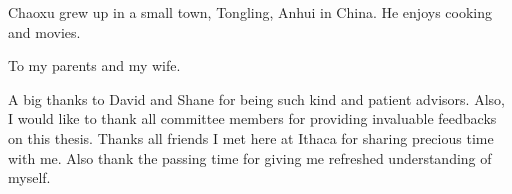 \documentclass[phd,tocprelim]{cornell}
\begin{document}
\begin{biosketch}
Chaoxu grew up in a small town, Tongling, Anhui in China. He enjoys cooking and movies.
\end{biosketch}

\begin{dedication}
To my parents and my wife.
\end{dedication}

\begin{acknowledgements}
A big thanks to David and Shane for being such kind and patient advisors.
Also, I would like to thank all committee members for providing
invaluable feedbacks on this thesis.
Thanks all friends I met here at Ithaca for sharing precious time with me.
Also thank the passing time for giving me refreshed understanding of myself.
\end{acknowledgements}

\contentspage
\tablelistpage
\figurelistpage

\normalspacing \setcounter{page}{1} 
\pagestyle{cornell} \addtolength{\parskip}{0.5\baselineskip}




%
%


\end{document}
